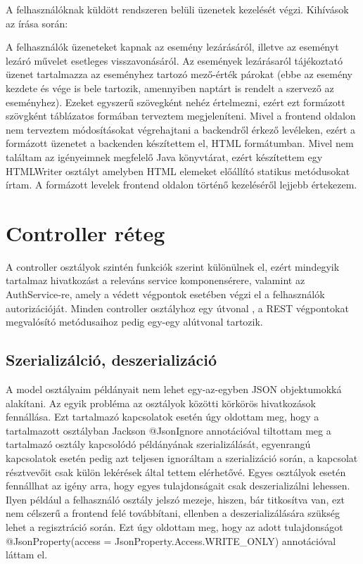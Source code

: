 \documentclass[a4paper,12pt]{report}
\theoremstyle{definition}
\theoremstyle{remark}
\begin{document}
A felhasználóknak küldött rendszeren belüli üzenetek kezelését végzi. Kihívások az írása során:

A felhasználók üzeneteket kapnak az esemény lezárásáról, illetve az eseményt lezáró művelet esetleges visszavonásáról. Az események lezárásaról tájékoztató üzenet tartalmazza az eseményhez tartozó mező-érték párokat (ebbe az esemény kezdete és vége is bele tartozik, amennyiben naptárt is rendelt a szervező az eseményhez). Ezeket egyszerű szövegként nehéz értelmezni, ezért ezt formázott szövgként táblázatos formában terveztem megjeleníteni. Mivel a frontend oldalon nem terveztem módosításokat végrehajtani a backendről érkező levéleken, ezért a formázott üzenetet a backenden készítettem el, HTML formátumban. Mivel nem találtam az igényeimnek megfelelő Java könyvtárat, ezért készítettem egy HTMLWriter osztályt amelyben HTML elemeket előállító statikus metódusokat írtam. A formázott levelek frontend oldalon történő kezeléséről lejjebb értekezem.

\section{Controller réteg}

A controller osztályok szintén funkciók szerint különülnek el, ezért mindegyik tartalmaz hivatkozást a releváns service komponensérere, valamint az AuthService-re, amely a védett végpontok esetében végzi el a felhasználók autorizációját. Minden controller osztályhoz egy útvonal , a REST végpontokat megvalósító metódusaihoz pedig egy-egy alútvonal tartozik.

\subsection{Szerializálció, deszerializáció}

A model osztályaim példányait nem lehet egy-az-egyben JSON objektumokká alakítani. Az egyik probléma az osztályok közötti körkörös hivatkozások fennállása. Ezt tartalmazó kapcsolatok esetén úgy oldottam meg, hogy a tartalmazott osztályban Jackson @JsonIgnore annotációval tiltottam meg a tartalmazó osztály kapcsolódó példányának szerializálását, egyenrangú kapcsolatok esetén pedig azt teljesen ignoráltam a szerializáció során, a kapcsolat résztvevőit csak külön lekérések által tettem elérhetővé. Egyes osztályok esetén fennállhat az igény arra, hogy egyes tulajdonságait csak deszerializálni lehessen. Ilyen például a felhasználó osztály jelszó mezeje, hiszen, bár titkosítva van, ezt nem célszerű a frontend felé továbbítani, ellenben a deszerializálására szükség lehet a regisztráció során. Ezt úgy oldottam meg, hogy az adott tulajdonságot @JsonProperty(access = JsonProperty.Access.WRITE\_ONLY) annotációval láttam el.
\end{document}
